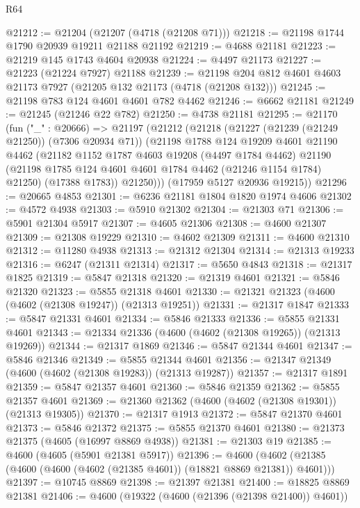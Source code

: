\begin{lexlean}{R64}
\begin{coremodule}
@21212 := @21204 (@21207 (@4718 (@21208 @71)))
@21218 := @21198 @1744 @1790 @20939 @19211 @21188 @21192
@21219 := @4688 @21181
@21223 := @21219 @145 @1743 @4604 @20938
@21224 := @4497 @21173
@21227 := @21223 (@21224 @7927) @21188
@21239 := @21198 @204 @812 @4601 @4603 @21173 @7927 (@21205 @132 @21173 (@4718 (@21208 @132)))
@21245 := @21198 @783 @124 @4601 @4601 @782 @4462
@21246 := @6662 @21181
@21249 := @21245 (@21246 @22 @782)
@21250 := @4738 @21181
@21295 := @21170
    (fun ("_" : @20666) =>
    @21197
      (@21212
        (@21218
          (@21227 (@21239 (@21249 @21250)) (@7306 @20934 @71))
          (@21198
            @1788
            @124
            @19209
            @4601
            @21190
            @4462
            (@21182
              @1152
              @1787
              @4603
              @19208
              (@4497 @1784 @4462)
              @21190
              (@21198 @1785 @124 @4601 @4601 @1784 @4462 (@21246 @1154 @1784) @21250)
              (@17388 @1783))
            @21250)))
      (@17959 @5127 @20936 @19215))
@21296 := @20665 @4853
@21301 := @6236 @21181 @1804 @1820 @1974 @4606
@21302 := @4572 @4938
@21303 := @5910 @21302
@21304 := @21303 @71
@21306 := @5901 @21304 @5917
@21307 := @4605 @21306
@21308 := @4600 @21307
@21309 := @21308 @19229
@21310 := @4602 @21309
@21311 := @4600 @21310
@21312 := @11280 @4938
@21313 := @21312 @21304
@21314 := @21313 @19233
@21316 := @6247 (@21311 @21314)
@21317 := @5650 @4843
@21318 := @21317 @1825
@21319 := @5847 @21318
@21320 := @21319 @4601
@21321 := @5846 @21320
@21323 := @5855 @21318 @4601
@21330 := @21321 @21323 (@4600 (@4602 (@21308 @19247)) (@21313 @19251))
@21331 := @21317 @1847
@21333 := @5847 @21331 @4601
@21334 := @5846 @21333
@21336 := @5855 @21331 @4601
@21343 := @21334 @21336 (@4600 (@4602 (@21308 @19265)) (@21313 @19269))
@21344 := @21317 @1869
@21346 := @5847 @21344 @4601
@21347 := @5846 @21346
@21349 := @5855 @21344 @4601
@21356 := @21347 @21349 (@4600 (@4602 (@21308 @19283)) (@21313 @19287))
@21357 := @21317 @1891
@21359 := @5847 @21357 @4601
@21360 := @5846 @21359
@21362 := @5855 @21357 @4601
@21369 := @21360 @21362 (@4600 (@4602 (@21308 @19301)) (@21313 @19305))
@21370 := @21317 @1913
@21372 := @5847 @21370 @4601
@21373 := @5846 @21372
@21375 := @5855 @21370 @4601
@21380 := @21373 @21375 (@4605 (@16997 @8869 @4938))
@21381 := @21303 @19
@21385 := @4600 (@4605 (@5901 @21381 @5917))
@21396 := @4600 (@4602 (@21385 (@4600 (@4600 (@4602 (@21385 @4601)) (@18821 @8869 @21381)) @4601)))
@21397 := @10745 @8869
@21398 := @21397 @21381
@21400 := @18825 @8869 @21381
@21406 := @4600 (@19322 (@4600 (@21396 (@21398 @21400)) @4601))

\end{coremodule}
\end{lexlean}

